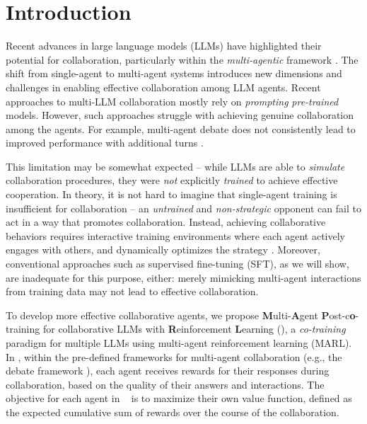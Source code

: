 \safevspace{-4mm}
\section{Introduction}




\safevspace{-2.2mm}
Recent advances in large language models (LLMs) have highlighted their potential for collaboration, particularly within the {\it multi-agentic} framework  \citep{du2023improving, li2023camel, kim2024adaptive}. The shift from single-agent to multi-agent systems introduces new dimensions and challenges in enabling effective collaboration among LLM agents. 
Recent approaches to  multi-LLM  collaboration mostly rely on 
{{\it prompting} {\it pre-trained} models. However,} such approaches struggle with achieving genuine collaboration among the agents. For example, multi-agent debate does not consistently lead to improved performance with additional turns \citep{huang2023large}.


This limitation may be somewhat expected -- while LLMs are able to {\it simulate} collaboration procedures, they were  {\it not} explicitly {\it trained} to achieve effective cooperation.
{In theory, it is not hard to imagine that single-agent training is insufficient for collaboration -- an {\it untrained} and {\it non-strategic} opponent can fail to act in a way that promotes  collaboration. 
Instead,} 
achieving collaborative behaviors requires interactive training environments where each agent actively engages with others, and dynamically optimizes the strategy \citep{gagne1974instruction,macy1991learning, hertz2013learning}. Moreover, conventional approaches such as supervised fine-tuning (SFT), as we will show, are inadequate for this purpose, either:  
merely mimicking multi-agent interactions from training data may not lead to effective collaboration. 

To develop more effective collaborative agents, we propose {\bf M}ulti-{\bf A}gent {\bf P}ost-c{\bf o}-training for collaborative LLMs with {\bf R}einforcement {\bf L}earning (\textbf{\ours}), a {\it co-training} paradigm for multiple LLMs using multi-agent reinforcement learning (MARL). In \ourstwo, within the  pre-defined frameworks for multi-agent collaboration ({e.g.}, the debate framework \citep{du2023improving}), each agent receives rewards for their responses during collaboration, based on the quality of their answers and interactions. The objective for each agent in  \ourstwo~ is to maximize their own value function, defined as the expected cumulative sum of rewards over the course of the collaboration.

